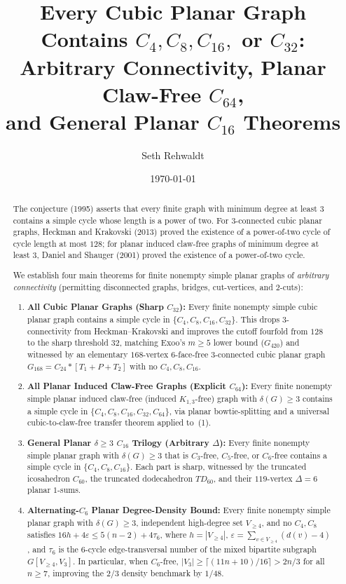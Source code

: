\documentclass[11pt,reqno]{amsart}
\title[Dyadic Cycles in Planar Graphs]{%
Every Cubic Planar Graph Contains $C_4, C_8, C_{16},$ or $C_{32}$:\\
Arbitrary Connectivity, Planar Claw-Free $C_{64}$,\\
and General Planar $C_{16}$ Theorems}
\author{Seth Rehwaldt}
\date{\today}
\theoremstyle{plain}
\theoremstyle{definition}
\theoremstyle{remark}
\newcommand{\EG}{\text{Erd\H{o}s--Gy\'arf\'as}}
\DeclareRobustCommand{\_}{\ifmmode\text{\textunderscore}\else\textunderscore\allowbreak\fi}
\begin{document}
\begin{abstract}
The \EG{} conjecture (1995) asserts that every finite graph with minimum degree at least $3$ contains a simple cycle whose length is a power of two. For $3$-connected cubic planar graphs, Heckman and Krakovski (2013) proved the existence of a power-of-two cycle of cycle length at most $128$; for planar induced claw-free graphs of minimum degree at least $3$, Daniel and Shauger (2001) proved the existence of a power-of-two cycle.

We establish four main theorems for finite nonempty simple planar graphs of \emph{arbitrary connectivity} (permitting disconnected graphs, bridges, cut-vertices, and $2$-cuts):
\begin{enumerate}[label=(\arabic*),leftmargin=2.2em]
  \item \textbf{All Cubic Planar Graphs (Sharp $C_{32}$):} Every finite nonempty simple cubic planar graph contains a simple cycle in $\{C_4, C_8, C_{16}, C_{32}\}$. This drops $3$-connectivity from Heckman--Krakovski and improves the cutoff fourfold from $128$ to the sharp threshold $32$, matching Exoo's $m \ge 5$ lower bound ($G_{420}$) and witnessed by an elementary $168$-vertex $6$-face-free $3$-connected cubic planar graph $G_{168} = C_{24} * [T_1 + P + T_2]$ with no $C_4, C_8, C_{16}$.
  \item \textbf{All Planar Induced Claw-Free Graphs (Explicit $C_{64}$):} Every finite nonempty simple planar induced claw-free (induced $K_{1,3}$-free) graph with $\delta(G) \ge 3$ contains a simple cycle in $\{C_4, C_8, C_{16}, C_{32}, C_{64}\}$, via planar bowtie-splitting and a universal cubic-to-claw-free transfer theorem applied to~(1).
  \item \textbf{General Planar $\delta \ge 3$ $C_{16}$ Trilogy (Arbitrary $\Delta$):} Every finite nonempty simple planar graph with $\delta(G) \ge 3$ that is $C_3$-free, $C_5$-free, or $C_6$-free contains a simple cycle in $\{C_4, C_8, C_{16}\}$. Each part is sharp, witnessed by the truncated icosahedron $C_{60}$, the truncated dodecahedron $TD_{60}$, and their $119$-vertex $\Delta = 6$ planar $1$-sums.
  \item \textbf{Alternating-$C_6$ Planar Degree-Density Bound:} Every finite nonempty simple planar graph with $\delta(G) \ge 3$, independent high-degree set $V_{\ge 4}$, and no $C_4, C_8$ satisfies $16 h + 4 \varepsilon \le 5(n - 2) + 4 \tau_6$, where $h = |V_{\ge 4}|$, $\varepsilon = \sum_{v \in V_{\ge 4}}(d(v) - 4)$, and $\tau_6$ is the $6$-cycle edge-transversal number of the mixed bipartite subgraph $G[V_{\ge 4}, V_3]$. In particular, when $C_6$-free, $|V_3| \ge \lceil(11n+10)/16\rceil > 2n/3$ for all $n \ge 7$, improving the $2/3$ density benchmark by $1/48$.

\end{enumerate}
\end{abstract}
\end{document}
